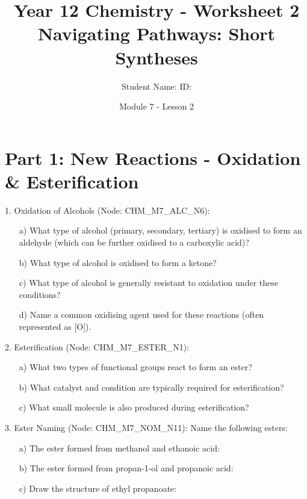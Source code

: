 \documentclass[11pt, a4paper]{article}
\title{Year 12 Chemistry - Worksheet 2 \\ Navigating Pathways: Short Syntheses}
\date{Module 7 - Lesson 2}
\author{Student Name: \underline{\hspace{5cm}} ID: \underline{\hspace{3cm}}}
\begin{document}
\maketitle

\section*{Part 1: New Reactions - Oxidation \& Esterification}

1.  Oxidation of Alcohols (Node: CHM\_M7\_ALC\_N6):
    \begin{itemize}
        \item[a)] What type of alcohol (primary, secondary, tertiary) is oxidised to form an aldehyde (which can be further oxidised to a carboxylic acid)? \vspace{0.5cm}
        \item[b)] What type of alcohol is oxidised to form a ketone? \vspace{0.5cm}
        \item[c)] What type of alcohol is generally resistant to oxidation under these conditions? \vspace{0.5cm}
        \item[d)] Name a common oxidising agent used for these reactions (often represented as [O]). \vspace{0.5cm}
    \end{itemize}

2.  Esterification (Node: CHM\_M7\_ESTER\_N1):
    \begin{itemize}
        \item[a)] What two types of functional groups react to form an ester? \vspace{0.5cm}
        \item[b)] What catalyst and condition are typically required for esterification? \vspace{0.5cm}
        \item[c)] What small molecule is also produced during esterification? \vspace{0.5cm}
    \end{itemize}

3.  Ester Naming (Node: CHM\_M7\_NOM\_N11): Name the following esters:
    \begin{itemize}
        \item[a)] The ester formed from methanol and ethanoic acid: \underline{\hspace{5cm}}
        \item[b)] The ester formed from propan-1-ol and propanoic acid: \underline{\hspace{5cm}}
        \item[c)] Draw the structure of ethyl propanoate: \vspace{2cm}
    \end{itemize}
\end{document}
